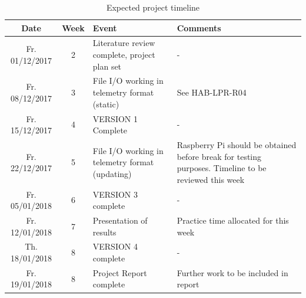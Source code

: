 \documentclass[11pt]{article}
\newenvironment{localsize}[1]
{%
  \clearpage
  \let\orignewcommand\newcommand
  \let\newcommand\renewcommand
  \makeatletter
  \makeatother
  \let\newcommand\orignewcommand
}
{%
  \clearpage
}
\begin{document}
\begin{localsize}{10}

\begin{table}[!h] \centering
 \begin{tabular}{|c c p{5cm} p{4.5cm}|} 
 \hline
 Date & Week & Event & Comments \\ [0.5ex] 
 \hline
 Fr. 01/12/2017 & 2 & Literature review complete, project plan set & - \\
 Fr. 08/12/2017 & 3 & File I/O working in telemetry format (static)  & See HAB-LPR-R04 \\
 Fr. 15/12/2017 & 4 & VERSION 1 Complete & - \\
 Fr. 22/12/2017 & 5 & File I/O working in telemetry format (updating) & Raspberry Pi should be obtained before break for testing purposes. Timeline to be reviewed this week \\
 Fr. 05/01/2018 & 6 & VERSION 3 complete & - \\ 
 Fr. 12/01/2018 & 7 & Presentation of results & Practice time allocated for this week \\
 Th. 18/01/2018 & 8 & VERSION 4 complete & - \\
 Fr. 19/01/2018 & 8 & Project Report complete & Further work to be included in report \\
 \hline
\end{tabular}
\caption{Expected project timeline}
\end{table}

\end{localsize}
\end{document}
